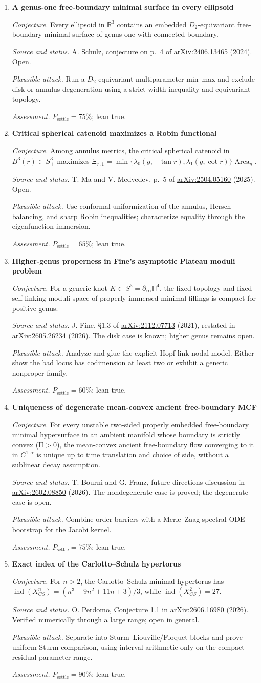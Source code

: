 \documentclass[11pt]{article}
\newcommand{\cand}[5]{%
  \item \textbf{#1}\par
  \emph{Conjecture.} #2\par
  \emph{Source and status.} #3\par
  \emph{Plausible attack.} #4\par
  \emph{Assessment.} #5
}
\newcommand{\psettle}{P_{\mathrm{settle}}}
\begin{document}
\begin{enumerate}[label=\textbf{L\arabic*.}]
\cand{A genus-one free-boundary minimal surface in every ellipsoid}
{Every ellipsoid in $\mathbb R^3$ contains an embedded $D_2$-equivariant free-boundary minimal surface of genus one with connected boundary.}
{A. Schulz, conjecture on p.~4 of \href{https://arxiv.org/abs/2406.13465}{arXiv:2406.13465} (2024).  Open.}
{Run a $D_2$-equivariant multiparameter min--max and exclude disk or annulus degeneration using a strict width inequality and equivariant topology.}
{$\psettle=75\%$; lean true.}

\cand{Critical spherical catenoid maximizes a Robin functional}
{Among annulus metrics, the critical spherical catenoid in $B^3(r)\subset S^3_+$ maximizes
$\Xi^+_{r,1}=\min\{\lambda_0(g,-\tan r),\lambda_1(g,\cot r)\}\operatorname{Area}_g$.}
{T. Ma and V. Medvedev, p.~5 of \href{https://arxiv.org/abs/2504.05160}{arXiv:2504.05160} (2025).  Open.}
{Use conformal uniformization of the annulus, Hersch balancing, and sharp Robin inequalities; characterize equality through the eigenfunction immersion.}
{$\psettle=65\%$; lean true.}

\cand{Higher-genus properness in Fine's asymptotic Plateau moduli problem}
{For a generic knot $K\subset S^3=\partial_\infty\mathbb H^4$, the fixed-topology and fixed-self-linking moduli space of properly immersed minimal fillings is compact for positive genus.}
{J. Fine, \S1.3 of \href{https://arxiv.org/abs/2112.07713}{arXiv:2112.07713} (2021), restated in \href{https://arxiv.org/abs/2605.26234}{arXiv:2605.26234} (2026).  The disk case is known; higher genus remains open.}
{Analyze and glue the explicit Hopf-link nodal model.  Either show the bad locus has codimension at least two or exhibit a generic nonproper family.}
{$\psettle=60\%$; lean true.}

\cand{Uniqueness of degenerate mean-convex ancient free-boundary MCF}
{For every unstable two-sided properly embedded free-boundary minimal hypersurface in an ambient manifold whose boundary is strictly convex ($\mathrm{II}>0$), the mean-convex ancient free-boundary flow converging to it in $C^{1,\alpha}$ is unique up to time translation and choice of side, without a sublinear decay assumption.}
{T. Bourni and G. Franz, future-directions discussion in \href{https://arxiv.org/abs/2602.08850}{arXiv:2602.08850} (2026).  The nondegenerate case is proved; the degenerate case is open.}
{Combine order barriers with a Merle--Zaag spectral ODE bootstrap for the Jacobi kernel.}
{$\psettle=75\%$; lean true.}

\cand{Exact index of the Carlotto--Schulz hypertorus}
{For $n>2$, the Carlotto--Schulz minimal hypertorus has
$\operatorname{ind}(X^n_{CS})=(n^3+9n^2+11n+3)/3$, while $\operatorname{ind}(X^2_{CS})=27$.}
{O. Perdomo, Conjecture 1.1 in \href{https://arxiv.org/abs/2606.16980}{arXiv:2606.16980} (2026).  Verified numerically through a large range; open in general.}
{Separate into Sturm--Liouville/Floquet blocks and prove uniform Sturm comparison, using interval arithmetic only on the compact residual parameter range.}
{$\psettle=90\%$; lean true.}


\end{enumerate}
\end{document}
